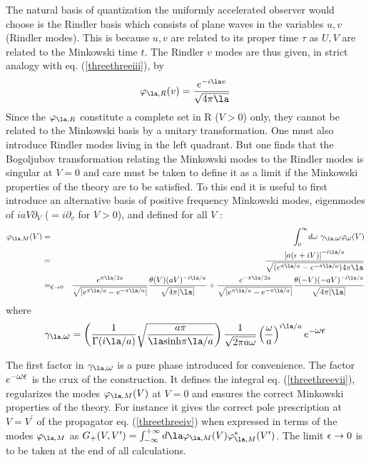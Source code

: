 \documentclass[12pt]{article}
\begin{document}
The natural basis of quantization the uniformly accelerated observer would
choose  is the Rindler basis which consists of plane waves in the variables
$u,v$ (Rindler modes). This is because $u, v$ are related to its proper time
$\tau$ as $U, V$
are
related to the Minkowski time $t$. The Rindler $v$ modes are thus
given, in strict analogy with eq. (\ref{threethreeiii}), by
\begin{equation} \varphi_{\la, R} (v) = {e^{-i\la v} \over \sqrt{4 \pi \la}}
\label{threethreeiiiv}
\end{equation}
Since the $\varphi_{\la, R}$ constitute a complete set in R ($V>0$)
only, they cannot be related to the Minkowski basis by a unitary
transformation.
One must also introduce Rindler modes living in the left quadrant.
But one finds that the Bogoljubov transformation relating the
  Minkowski
modes to the Rindler modes is singular  at $V=0$ \cite{tmunu}
 and care must be
taken to define it as a limit if the Minkowski properties of the theory are
to be satisfied.
To this end it is useful to first introduce an alternative basis
of positive frequency Minkowski modes,
eigenmodes of $iaV\partial_V$ ($=i\partial_v$ for $V>0$),
and defined for all $V$
\cite{Unruh}:
\begin{eqnarray}  \varphi_{\la,M}(V) &=& \int_0^{\infty}\! d\omega\
\gamma_{\la,\om} \varphi_{\om}(V) \nonumber\\ &=& {\left[ a(\e +
iV)\right]^{-i \la /a} \over  \sqrt{ ( e^{\pi \la /a} - e^{-\pi \la /a})4 \pi
\la}}\nonumber\\  &=_{\e\rightarrow 0}&
{e^{\pi \la/2a}\over  \sqrt{\vert e^{\pi \la /a} -
e^{-\pi \la /a}\vert}} { \theta(V)(aV)^{-i \la /a}
\over \sqrt{4 \pi \vert \la\vert}} +
{e^{-\pi \la/2a}\over \sqrt{\vert e^{\pi \la /a} - e^{-\pi \la /a}\vert}}
{\theta(-V) (-aV )^{-i \la /a} \over \sqrt{ 4 \pi \vert \la\vert}}
\nonumber\\
\label{threethreevii} \end{eqnarray}
where \begin{equation}  \gamma_{\la,\om}=
\left({1\over \Gamma({i\la/ a})}  \sqrt{a \pi \over {\la }
\mbox{sinh}{\pi \la /a} }\right) {1 \over \sqrt{2 \pi a \om}} \left(
{\om \over
a } \right)^{i\la/ a} e^{-\om \e} \label{threethreeviii} \end{equation}

The first factor in $\gamma_{\la,\om}$ is a pure phase introduced for
convenience. The factor $ e^{-\mbox{$ \omega $} \mbox{$ \epsilon $}}$ is the crux of the construction.
It
defines the integral eq. (\ref{threethreevii}), regularizes the modes
$\varphi_{\la,M}(V)$ at $V=0$  and ensures the correct
Minkowski
properties of the theory. For instance it gives the correct pole
prescription
at $V=V^\prime$ of the propagator eq. (\ref{threethreeiv}) when expressed in
terms
of the modes $\varphi_{\la,M}$ as $G_+(V,V^\prime) = \int_{-\infty}^{+
\infty}
d \la   \varphi_{\la,M}(V)\varphi_{\la,M}^*(V^\prime)$. The limit $\mbox{$ \epsilon $}
\rightarrow 0$ is to be taken at the end of all calculations.
\end{document}
